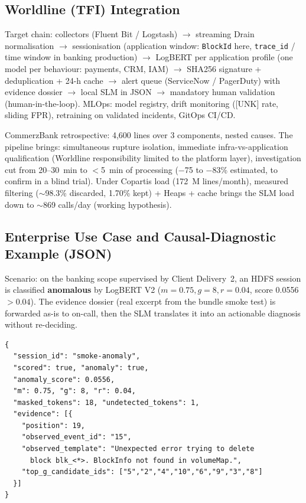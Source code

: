 \documentclass[12pt,a4paper]{report}
\begin{document}
\subsection{Worldline (TFI) Integration}

Target chain: collectors (Fluent Bit / Logstash) $\rightarrow$ streaming Drain normalisation $\rightarrow$ sessionisation (application window: \texttt{BlockId} here, \texttt{trace\_id} / time window in banking production) $\rightarrow$ LogBERT per application profile (one model per behaviour: payments, CRM, IAM) $\rightarrow$ SHA256 signature + deduplication + 24-h cache $\rightarrow$ alert queue (ServiceNow / PagerDuty) with evidence dossier $\rightarrow$ local SLM in JSON $\rightarrow$ mandatory human validation (human-in-the-loop). MLOps: model registry, drift monitoring ([UNK] rate, sliding FPR), retraining on validated incidents, GitOps CI/CD.

CommerzBank retrospective: 4,600 lines over 3 components, nested causes. The pipeline brings: simultaneous rupture isolation, immediate infra-vs-application qualification (Worldline responsibility limited to the platform layer), investigation cut from 20--30~min to $<$5~min of processing ($-$75 to $-$83\% estimated, to confirm in a blind trial). Under Copartis load (172~M lines/month), measured filtering ($\sim$98.3\% discarded, 1.70\% kept) + Heaps + cache brings the SLM load down to $\sim$869 calls/day (working hypothesis).

\subsection{Enterprise Use Case and Causal-Diagnostic Example (JSON)}

Scenario: on the banking scope supervised by Client Delivery~2, an HDFS session is classified \textbf{anomalous} by LogBERT V2 ($m{=}0{.}75,g{=}8,r{=}0{.}04$, score 0.0556 $> 0{.}04$). The evidence dossier (real excerpt from the bundle smoke test) is forwarded as-is to on-call, then the SLM translates it into an actionable diagnosis without re-deciding.

{\small\begin{verbatim}
{
  "session_id": "smoke-anomaly",
  "scored": true, "anomaly": true,
  "anomaly_score": 0.0556,
  "m": 0.75, "g": 8, "r": 0.04,
  "masked_tokens": 18, "undetected_tokens": 1,
  "evidence": [{
    "position": 19,
    "observed_event_id": "15",
    "observed_template": "Unexpected error trying to delete
      block blk_<*>. BlockInfo not found in volumeMap.",
    "top_g_candidate_ids": ["5","2","4","10","6","9","3","8"]
  }]
}
\end{verbatim}\par}
\end{document}
